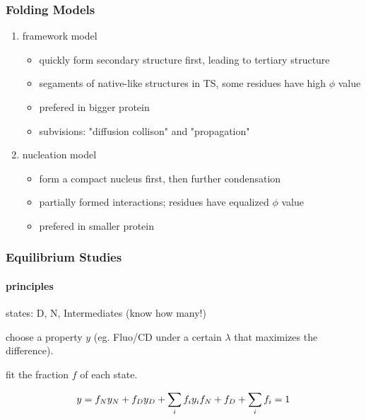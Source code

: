 \documentclass[]{article}
\let\oldparagraph\paragraph
\renewcommand{\paragraph}[1]{\oldparagraph{#1}\mbox{}}
\begin{document}
\hypertarget{folding-models}{%
\subsubsection{Folding Models}\label{folding-models}}

\begin{enumerate}
\def\labelenumi{\arabic{enumi}.}
\item
  framework model

  \begin{itemize}
  \item
    quickly form secondary structure first, leading to tertiary
    structure
  \item
    segaments of native-like structures in TS, some residues have high
    \(\phi\) value
  \item
    prefered in bigger protein
  \item
    subvisions: "diffusion collison" and "propagation"
  \end{itemize}
\item
  nucleation model

  \begin{itemize}
  \item
    form a compact nucleus first, then further condensation
  \item
    partially formed interactions; residues have equalized \(\phi\)
    value
  \item
    prefered in smaller protein
  \end{itemize}
\end{enumerate}

\hypertarget{equilibrium-studies}{%
\subsubsection{Equilibrium Studies}\label{equilibrium-studies}}

\hypertarget{principles-2}{%
\paragraph{principles}\label{principles-2}}

states: D, N, Intermediates (know how many!)

choose a property \(y\) (eg. Fluo/CD under a certain \(\lambda\) that
maximizes the difference).

fit the fraction \(f\) of each state.

\[y=f_Ny_N+f_Dy_D+\sum_if_iy_i\\
f_N+f_D+\sum_if_i=1\]
\end{document}
